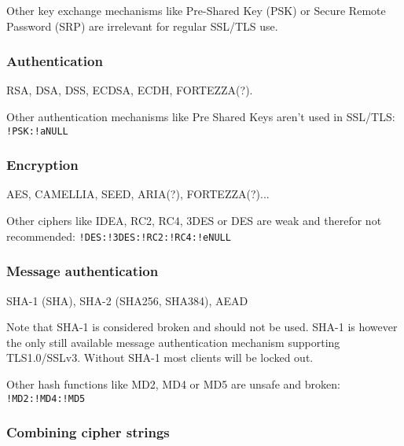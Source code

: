 Other key exchange mechanisms like Pre-Shared Key (PSK) or Secure Remote Password
(SRP) are irrelevant for regular SSL/TLS use.

\subsubsection{Authentication}

RSA, DSA, DSS, ECDSA, ECDH, FORTEZZA(?).

Other authentication mechanisms like Pre Shared Keys aren't used in SSL/TLS: \texttt{!PSK:!aNULL}

\subsubsection{Encryption}

AES, CAMELLIA, SEED, ARIA(?), FORTEZZA(?)...

Other ciphers like IDEA, RC2, RC4, 3DES or DES are weak and therefor not recommended:
\texttt{!DES:!3DES:!RC2:!RC4:!eNULL}

\subsubsection{Message authentication}

SHA-1 (SHA), SHA-2 (SHA256, SHA384), AEAD

Note that SHA-1 is considered broken and should not be used. SHA-1 is however the
only still available message authentication mechanism supporting TLS1.0/SSLv3. Without
SHA-1 most clients will be locked out.

Other hash functions like MD2, MD4 or MD5 are unsafe and broken: \texttt{!MD2:!MD4:!MD5}

\subsubsection{Combining cipher strings}


